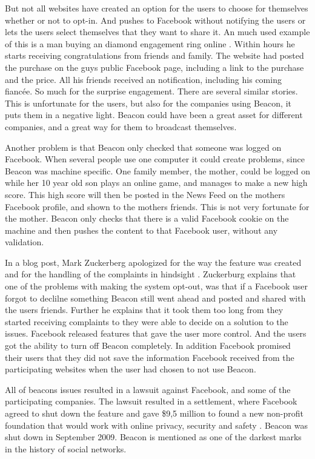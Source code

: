 But not all websites have created an option for the users to choose for themselves whether or not to opt-in. And pushes to Facebook without notifying the users or lets the users select themselves that they want to share it. An much used example of this is a man buying an diamond engagement ring online \cite{ring}. Within hours he starts receiving congratulations from friends and family. The website had posted the purchase on the guys public Facebook page, including a link to the purchase and the price. All his friends received an notification, including his coming fiancée. So much for the surprise engagement. There are several similar stories.  
This is unfortunate for the users, but also for the companies using Beacon, it puts them in a negative light. Beacon could have been a great asset for different companies, and a great way for them to broadcast themselves. 

Another problem is that Beacon only checked that someone was logged on Facebook. When several people use one computer it could create problems, since Beacon was machine specific. One family member, the mother, could be logged on while her 10 year old son plays an online game, and manages to make a new high score. This high score will then be posted in the News Feed on the mothers Facebook profile, and shown to the mothers friends. This is not very fortunate for the mother. Beacon only checks that there is a valid Facebook cookie on the machine and then pushes the content to that Facebook user, without any validation. 

In a blog post, Mark Zuckerberg apologized for the way the feature was created and for the handling of the complaints in hindsight \cite{Beacon}. Zuckerburg explains that one of the problems with making the system opt-out, was that if a Facebook user forgot to declilne something Beacon still went ahead and posted and shared with the users friends. Further he explains that it took them too long from they started receiving complaints to they were able to decide on a solution to the issues. Facebook released features that gave the user more control. And the users got the ability to turn off Beacon completely.  In addition Facebook promised their users that they did not save the information Facebook received from the participating websites when the user had chosen to not use Beacon. 

All of beacons issues resulted in a lawsuit against Facebook, and some of the participating companies. The lawsuit resulted in a settlement, where Facebook agreed to shut down the feature and gave \$9,5 million to found a new non-profit foundation that would work with online privacy, security and safety \cite{lawsuitB}. Beacon was shut down in September 2009. Beacon is mentioned as one of the darkest marks in the history of social networks.

